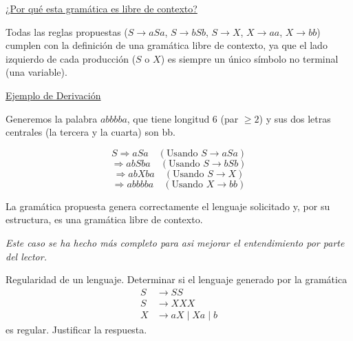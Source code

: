 \documentclass[12pt]{report} %
\begin{document}
\begin{ejercicio}
\begin{enumerate}[label=\alph*)]
\begin{solucion}
    \underline{¿Por qué esta gramática es libre de contexto?}

    Todas las reglas propuestas (\( S \to aSa \), \( S \to bSb \), \( S \to X \), \( X \to aa \), \( X \to bb \)) cumplen con la definición de una gramática libre de contexto, ya que el lado izquierdo de cada producción (\( S \) o \( X \)) es siempre un único símbolo no terminal (una variable).

    \underline{Ejemplo de Derivación}

    Generemos la palabra \( abbbba \), que tiene longitud 6 (par \( \geq 2 \)) y sus dos letras centrales (la tercera y la cuarta) son bb.

    \[
    S \Rightarrow aSa \quad (\text{Usando } S \to aSa)
    \]
    \[
    \Rightarrow abSba \quad (\text{Usando } S \to bSb)
    \]
    \[
    \Rightarrow abXba \quad (\text{Usando } S \to X)
    \]
    \[
    \Rightarrow abbbba \quad (\text{Usando } X \to bb)
    \]

    La gramática propuesta genera correctamente el lenguaje solicitado y, por su estructura, es una gramática libre de contexto.

    \textit{Este caso se ha hecho más completo para asi mejorar el entendimiento por parte del lector.}
    \end{solucion}


\end{enumerate}

\end{ejercicio}

\begin{ejercicio}
Regularidad de un lenguaje.
Determinar si el lenguaje generado por la gramática  
\begin{align*}
S &\to SS \\
S &\to XXX \\
X &\to aX \mid Xa \mid b
\end{align*}
es regular. Justificar la respuesta.
\end{ejercicio}
\end{document}
